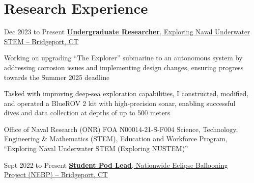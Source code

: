 \section{Research Experience}
    \begin{twocolentry}{
        Dec 2023 to Present
    }
        \href{https://nustem.bridgeport.edu/}{\textbf{Undergraduate Researcher}, Exploring Naval Underwater STEM -- Bridgeport, CT}
    \end{twocolentry}

    \vspace{0.10 cm}
    \begin{onecolentry}
        \begin{highlights}
            \item Working on upgrading “The Explorer” submarine to an autonomous system by addressing corrosion issues and implementing design changes, ensuring progress towards the Summer 2025 deadline
            \item Tasked with improving deep-sea exploration capabilities, I constructed, modified, and operated a BlueROV 2 kit with high-precision sonar, enabling successful dives and data collection at depths of up to 500 meters
            \item Office of Naval Research (ONR) FOA N00014-21-S-F004 Science, Technology, Engineering \& Mathematics (STEM), Education and Workforce Program, “Exploring Naval Underwater STEM (Exploring NUSTEM)”
        \end{highlights}
    \end{onecolentry}

    \vspace{0.2 cm}

    \begin{twocolentry}{
        Sept 2022 to Present
    }
        \href{http://eclipse.montana.edu/}{\textbf{Student Pod Lead}, Nationwide Eclipse Ballooning Project (NEBP) -- Bridgeport, CT}
    \end{twocolentry}

